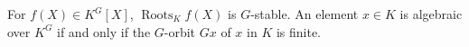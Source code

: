For $f(X) \in K^G[X]$, $\operatorname{Roots}_K f(X)$ is $G$-stable. An element $x \in K$ is algebraic over $K^G$ if and only if the $G$-orbit $Gx$ of $x$ in $K$ is finite.
